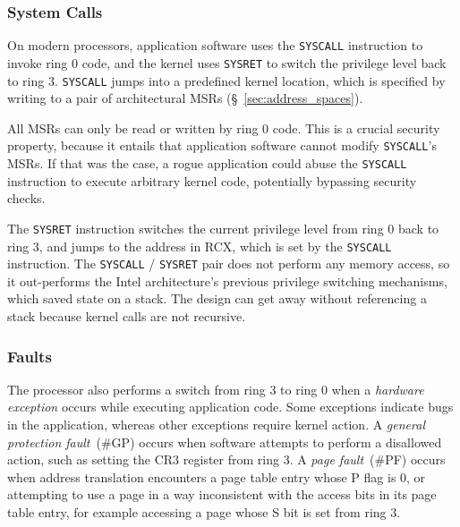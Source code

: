 \subsubsection{System Calls}
\label{sec:syscalls}


On modern processors, application software uses the \texttt{SYSCALL}
instruction to invoke ring 0 code, and the kernel uses \texttt{SYSRET} to
switch the privilege level back to ring 3. \texttt{SYSCALL} jumps into a
predefined kernel location, which is specified by writing to a pair of
architectural MSRs (\S~\ref{sec:address_spaces}).

All MSRs can only be read or written by ring 0 code. This is a crucial security
property, because it entails that application software cannot modify
\texttt{SYSCALL}'s MSRs. If that was the case, a rogue application could abuse
the \texttt{SYSCALL} instruction to execute arbitrary kernel code, potentially
bypassing security checks.

The \texttt{SYSRET} instruction switches the current privilege level from ring
0 back to ring 3, and jumps to the address in RCX, which is set by the
\texttt{SYSCALL} instruction. The \texttt{SYSCALL} / \texttt{SYSRET} pair does
not perform any memory access, so it out-performs the Intel architecture's
previous privilege switching mechanisms, which saved state on a stack. The
design can get away without referencing a stack because kernel calls are not
recursive.


\subsubsection{Faults}
\label{sec:faults}


The processor also performs a switch from ring 3 to ring 0 when a
\textit{hardware exception} occurs while executing application code. Some
exceptions indicate bugs in the application, whereas other exceptions require
kernel action. A \textit{general protection fault}~(\#GP) occurs when software
attempts to perform a disallowed action, such as setting the CR3 register from
ring 3. A \textit{page fault}~(\#PF) occurs when address translation encounters
a page table entry whose P flag is 0, or attempting to use a page in a way
inconsistent with the access bits in its page table entry, for example
accessing a page whose S bit is set from ring 3.

